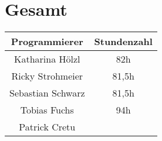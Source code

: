 \section{Gesamt}
\begin{center}
	\begin{tabular}{|c|c|}
		\hline \textbf{Programmierer} & \textbf{Stundenzahl} \\ 
		\hline Katharina Hölzl  &  82h\\ 
		\hline Ricky Strohmeier & 81,5h \\ 
		\hline Sebastian Schwarz & 81,5h \\ 
		\hline Tobias Fuchs &  94h\\ 
		\hline Patrick Cretu &  \\ 
		\hline 
	\end{tabular}
\end{center} 